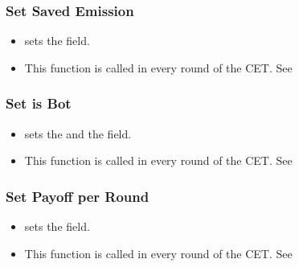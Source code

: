 \documentclass[letterpaper,10pt,english]{sphinxmanual}
\begin{document}
\subsubsection{Set Saved Emission}
\label{\detokenize{Player_fields:set-saved-emission}}\begin{itemize}
\item {} 
 sets the  field.

\item {} 
This function is called in every round of the CET. See {\hyperref[\detokenize{pages:exp-page}]{}}

\end{itemize}


\subsubsection{Set is Bot}
\label{\detokenize{Player_fields:set-is-bot}}\begin{itemize}
\item {} 
 sets the  and the  field.

\item {} 
This function is called in every round of the CET. See {\hyperref[\detokenize{pages:exp-page}]{}}

\end{itemize}


\subsubsection{Set Payoff per Round}
\label{\detokenize{Player_fields:set-payoff-per-round}}\begin{itemize}
\item {} 
 sets the  field.

\item {} 
This function is called in every round of the CET. See {\hyperref[\detokenize{pages:exp-page}]{}}

\end{itemize}
\end{document}
